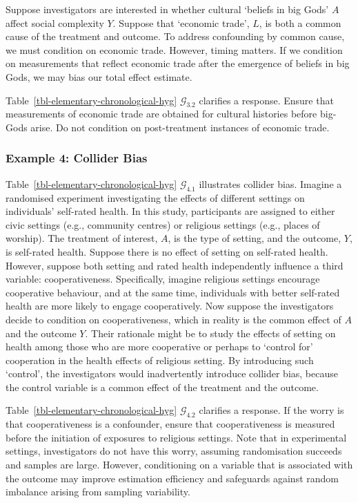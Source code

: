 \documentclass[
  single column]{article}
\begin{document}
Suppose investigators are interested in whether cultural `beliefs in big
Gods' \(A\) affect social complexity \(Y\). Suppose that `economic
trade', \(L\), is both a common cause of the treatment and outcome. To
address confounding by common cause, we must condition on economic
trade. However, timing matters. If we condition on measurements that
reflect economic trade after the emergence of beliefs in big Gods, we
may bias our total effect estimate.

Table~\ref{tbl-elementary-chronological-hyg} \(\mathcal{G}_{3.2}\)
clarifies a response. Ensure that measurements of economic trade are
obtained for cultural histories before big-Gods arise. Do not condition
on post-treatment instances of economic trade.

\subsubsection{Example 4: Collider Bias}\label{example-4-collider-bias}

Table~\ref{tbl-elementary-chronological-hyg} \(\mathcal{G}_{4.1}\)
illustrates collider bias. Imagine a randomised experiment investigating
the effects of different settings on individuals' self-rated health. In
this study, participants are assigned to either civic settings (e.g.,
community centres) or religious settings (e.g., places of worship). The
treatment of interest, \(A\), is the type of setting, and the outcome,
\(Y\), is self-rated health. Suppose there is no effect of setting on
self-rated health. However, suppose both setting and rated health
independently influence a third variable: cooperativeness. Specifically,
imagine religious settings encourage cooperative behaviour, and at the
same time, individuals with better self-rated health are more likely to
engage cooperatively. Now suppose the investigators decide to condition
on cooperativeness, which in reality is the common effect of \(A\) and
the outcome \(Y\). Their rationale might be to study the effects of
setting on health among those who are more cooperative or perhaps to
`control for' cooperation in the health effects of religious setting. By
introducing such `control', the investigators would inadvertently
introduce collider bias, because the control variable is a common effect
of the treatment and the outcome.

Table~\ref{tbl-elementary-chronological-hyg} \(\mathcal{G}_{4.2}\)
clarifies a response. If the worry is that cooperativeness is a
confounder, ensure that cooperativeness is measured before the
initiation of exposures to religious settings. Note that in experimental
settings, investigators do not have this worry, assuming randomisation
succeeds and samples are large. However, conditioning on a variable that
is associated with the outcome may improve estimation efficiency and
safeguards against random imbalance arising from sampling variability.
\end{document}
